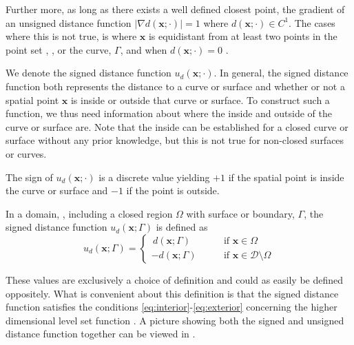 Further more, as long as there exists a well defined closest point, the gradient of an unsigned distance function $|\nabla d(\mathbf{x}; \cdot)| = 1$ where $d(\mathbf{x}; \cdot) \in C^1$. The cases where this is not true, is where $\mathbf{x}$ is equidistant from at least two points in the point set , \pointset, or the curve, $\Gamma$, and when $d(\mathbf{x}; \cdot)=0$ \cite{2003-book}.
\begin{comment}
\begin{proposition}[The gradient of a distance function]\label{prop:grad-distance}
For a distance function $d(\mathbf{x};\cdot)$ applied to either a curve or a point set, the following is true.
\begin{equation}
    |\nabla d(\mathbf{x}; \cdot)| = 1, \qquad \forall \mathbf{x} \
    \label{eq:gradient-1}
\end{equation}

\end{proposition}
\begin{proof}
\todo{Skal jeg ta det med her? I appendix? Jeg kan jo ikke referere til deg Anne, men jeg har jo ikke bevist det selv?}
\end{proof}

\end{comment}

We denote the signed distance function $u_d(\mathbf{x}; \cdot)$. In general, the signed distance function both represents the distance to a curve or surface and whether or not a spatial point $\mathbf{x}$ is inside or outside that curve or surface. To construct such a function, we thus need information about where the inside and outside of the curve or surface are. Note that the inside can be established for a closed curve or surface without any prior knowledge, but this is not true for non-closed surfaces or curves. 

The sign of $u_d(\mathbf{x}; \cdot)$ is a discrete value yielding $+1$ if the spatial point is inside the curve or surface and $-1$ if the point is outside. 
\begin{definition}
In a domain, \domain, including a closed region $\Omega$ with surface or boundary, $\Gamma$, the signed distance function $u_d(\mathbf{x};\Gamma)$ is defined as
\begin{equation*}u_d(\mathbf{x};\Gamma) = \begin{cases} \, d(\mathbf{x}; \Gamma) \qquad & \text{if } \mathbf{x}\in \Omega\\ -d(\mathbf{x}; \Gamma) \qquad & \text{if } \mathbf{x}\in \mathcal{D} \setminus \Omega\end{cases}
\end{equation*}
\label{def:signed-dist}
\end{definition}
These values are exclusively a choice of definition and could as easily be defined oppositely. What is convenient about this definition is that the signed distance function satisfies the conditions \eqref{eq:interior}-\eqref{eq:exterior} concerning the higher dimensional level set function \uxt. A picture showing both the signed and unsigned distance function together can be viewed in .

